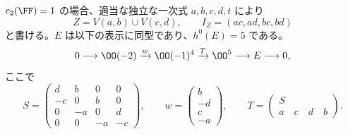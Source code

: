 \begin{lemma}[二平面からの拡大をすべて書く]
\label{lem:two-planes-extensions}
$c_2(\FF)=1$ の場合、適当な独立な一次式 $a,b,c,d,t$ により
\[
 Z=V(a,b)\cup V(c,d),\qquad I_Z=(ac,ad,bc,bd)
\]
と書ける。$E$ は以下の表示に同型であり、$h^0(E)=5$ である。
\begin{equation}
 0\longrightarrow\OO(-2)\xrightarrow{w}\OO(-1)^4
 \xrightarrow{T}\OO^5\longrightarrow E\longrightarrow0,
 \label{eq:two-plane-E-resolution}
\end{equation}
ここで
\[
 S=\begin{pmatrix}
 d&b&0&0\\-c&0&b&0\\0&-a&0&d\\0&0&-a&-c
 \end{pmatrix},\qquad
 w=\begin{pmatrix}b\\-d\\c\\-a\end{pmatrix},\qquad
 T=\begin{pmatrix}S\\ a\quad c\quad d\quad b\end{pmatrix}.
\]
\end{lemma}

